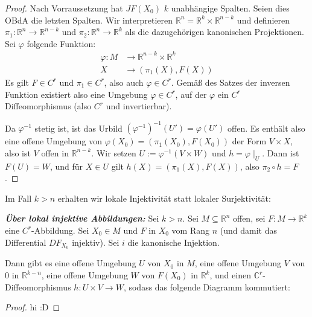 \documentclass{report}
\newcommand*{\newpar}{\par\vspace{\baselineskip}\noindent}
\newcommand{\tbf}[1]{\textbf{#1}}
\newcommand{\bC}{\mathbb{C}}
\newcommand{\bR}{\mathbb{R}}
\begin{document}
\begin{proof}
Nach Vorraussetzung hat $JF(X_0)$ $k$ unabhängige Spalten. Seien dies OBdA die letzten Spalten. Wir interpretieren $\bR^n = \bR^k \times \bR^{n-k}$ und definieren $\pi_1 : \bR^n \to \bR^{n-k}$ und $\pi_2 : \bR^n \to \bR^k$ als die dazugehörigen kanonischen Projektionen. Sei $\varphi$ folgende Funktion:
\begin{align*}
 \varphi : M &\to \bR^{n-k} \times \bR^k\\
 X &\to (\pi_1(X), F(X))
\end{align*}
Es gilt $F \in C^r$ und $\pi_1 \in C^r$, also auch $\varphi \in C^r$. Gemäß des Satzes der inversen Funktion existiert also eine Umgebung $\varphi \in C^r$, auf der $\varphi$ ein $C^r$ Diffeomorphismus (also $C^r$ und invertierbar).
\newpar
Da $\varphi^{-1}$ stetig ist, ist das Urbild $(\varphi^{-1})^{-1}(U') = \varphi(U')$ offen. Es enthält also eine offene Umgebung von $\varphi(X_0) = (\pi_1(X_0), F(X_0))$ der Form $V \times X$, also ist $V$ offen in $\bR^{n-k}$. Wir setzen $U := \varphi^{-1}(V \times W)$ und $h = \varphi \mid_U$. Dann ist $F(U) = W$, und für $X \in U$ gilt $h(X) = (\pi_1(X), F(X))$, also $\pi_2 \circ h = F$.
\end{proof}
\noindent Im Fall $k > n$ erhalten wir lokale Injektivität statt lokaler Surjektivität:
\begin{theorem}
 \emph{\tbf{Über lokal injektive Abbildungen:}} Sei $k > n$. Sei $M \subseteq \bR^n$ offen, sei $F : M \to \bR^k$ eine $C^r$-Abbildung. Sei $X_0 \in M$ und $F$ in $X_0$ vom Rang $n$ (und damit das Differential $DF_{X_0}$ injektiv). Sei $i$ die kanonische Injektion.
 \newpar
 Dann gibt es eine offene Umgebung $U$ von $X_0$ in $M$, eine offene Umgebung $V$ von $0$ in $\bR^{k-n}$, eine offene Umgebung $W$ von $F(X_0)$ in $\bR^k$, und einen $\bC^r$-Diffeomorphismus $h : U \times V \to W$, sodass das folgende Diagramm kommutiert:
 \FloatBarrier
 \begin{figure}[h!]
 \centering
\end{figure}
\end{theorem}
\FloatBarrier
\begin{proof}
 hi :D
\end{proof}
\end{document}
